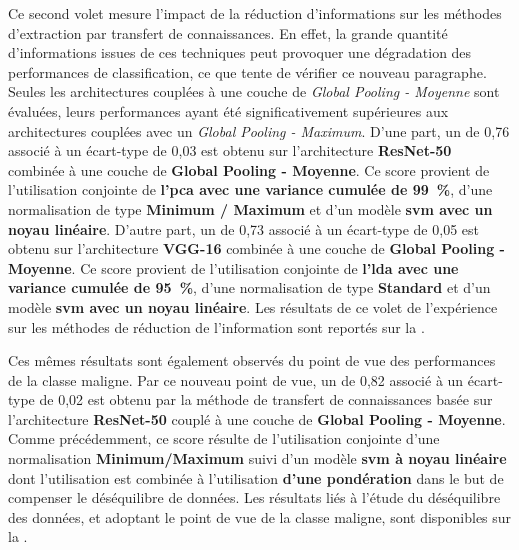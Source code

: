Ce second volet mesure l'impact de la réduction d'informations sur les méthodes d'extraction par transfert de connaissances. En effet, la grande quantité d'informations issues de ces techniques peut provoquer une dégradation des performances de classification, ce que tente de vérifier ce nouveau paragraphe. Seules les architectures couplées à une couche de \textit{Global Pooling - Moyenne} sont évaluées, leurs performances ayant été significativement supérieures aux architectures couplées avec un \textit{Global Pooling - Maximum}. D'une part, un \fscore{} de 0,76 associé à un écart-type de 0,03 est obtenu sur l'architecture \textbf{ResNet-50} combinée à une couche de \textbf{Global Pooling - Moyenne}. Ce score provient de l'utilisation conjointe de \textbf{l'\gls{pca} avec une variance cumulée de 99~\%}, d'une normalisation de type \textbf{Minimum / Maximum} et d'un modèle \textbf{\gls{svm} avec un noyau linéaire}. D'autre part, un \fscore{} de 0,73 associé à un écart-type de 0,05 est obtenu sur l'architecture \textbf{VGG-16} combinée à une couche de \textbf{Global Pooling - Moyenne}. Ce score provient de l'utilisation conjointe de \textbf{l'\gls{lda} avec une variance cumulée de 95~\%}, d'une normalisation de type \textbf{Standard} et d'un modèle \textbf{\gls{svm} avec un noyau linéaire}. Les résultats de ce volet de l'expérience sur les méthodes de réduction de l'information sont reportés sur la .\par

Ces mêmes résultats sont également observés du point de vue des performances de la classe maligne. Par ce nouveau point de vue, un \fscore{} de 0,82 associé à un écart-type de 0,02 est obtenu par la méthode de transfert de connaissances basée sur l'architecture \textbf{ResNet-50} couplé à une couche de \textbf{Global Pooling - Moyenne}. Comme précédemment, ce score résulte de l'utilisation conjointe d'une normalisation \textbf{Minimum/Maximum} suivi d'un modèle \textbf{\gls{svm} à noyau linéaire} dont l'utilisation est combinée à l'utilisation \textbf{d'une pondération} dans le but de compenser le déséquilibre de données. Les résultats liés à l'étude du déséquilibre des données, et adoptant le point de vue de la classe maligne, sont disponibles sur la .\par

